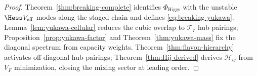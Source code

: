 \begin{proof}
Theorem~\ref{thm:breaking-complete} identifies $\Phi_{\mathrm{Higgs}}$ with
the unstable $\Hess V_{\mathrm{eff}}$ modes along the staged chain and defines
\eqref{eq:breaking-yukawa}. Lemma~\ref{lem:yukawa-cellular} reduces the cubic
overlap to $\mathcal{T}_7$ hub pairings; Proposition~\ref{prop:yukawa-factor}
and Theorem~\ref{thm:yukawa-mass} fix the diagonal spectrum from capacity
weights. Theorem~\ref{thm:flavon-hierarchy} activates off-diagonal hub pairings;
Theorem~\ref{thm:Hij-derived} derives $\mathcal{H}_{ij}$ from $V_F$
minimization, closing the mixing sector at leading order.
\end{proof}